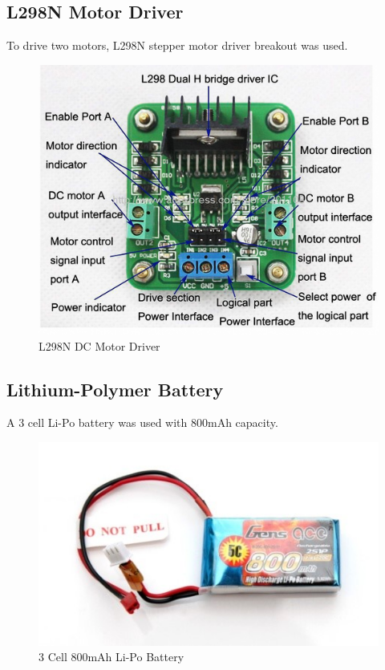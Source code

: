 \documentclass[14pt,a4paper]{extarticle}
\begin{document}
	\subsection{L298N Motor Driver}
	
	To drive two motors, L298N stepper motor driver breakout was used.
	
	\begin{figure}[H]
		\includegraphics[scale=0.5,center]{l298n.jpg}
		\caption{L298N DC Motor Driver}
	\end{figure}
	
	\subsection{Lithium-Polymer Battery}
	
	A 3 cell Li-Po battery was used with 800mAh capacity.
	
	\begin{figure}[H]
		\includegraphics[center]{lipo.jpg}
		\caption{3 Cell 800mAh Li-Po Battery}
	\end{figure}
	
\end{document}

